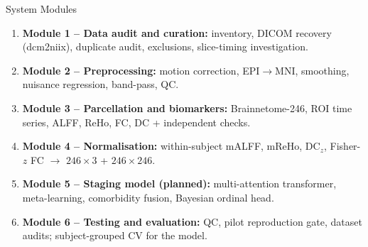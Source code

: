 \documentclass[aspectratio=169,11pt]{beamer}
\begin{document}
\begin{frame}{System Modules}
  \small
  \begin{enumerate}
    \item \textbf{Module 1 -- Data audit and curation:} inventory, DICOM recovery
          (dcm2niix), duplicate audit, exclusions, slice-timing investigation.
    \item \textbf{Module 2 -- Preprocessing:} motion correction, EPI$\rightarrow$MNI,
          smoothing, nuisance regression, band-pass, QC.
    \item \textbf{Module 3 -- Parcellation and biomarkers:} Brainnetome-246,
          ROI time series, ALFF, ReHo, FC, DC + independent checks.
    \item \textbf{Module 4 -- Normalisation:} within-subject mALFF, mReHo,
          DC$_z$, Fisher-$z$ FC $\rightarrow$ $246\times3$ + $246\times246$.
    \item \textbf{Module 5 -- Staging model (planned):} multi-attention transformer,
          meta-learning, comorbidity fusion, Bayesian ordinal head.
    \item \textbf{Module 6 -- Testing and evaluation:} QC, pilot reproduction gate,
          dataset audits; subject-grouped CV for the model.
  \end{enumerate}
\end{frame}
\end{document}
